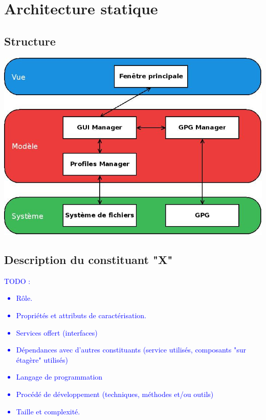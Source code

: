 \documentclass{../res/univ-projet}
\begin{document}
\section{Architecture statique}
  \subsection{Structure} %
    \includegraphics[scale=0.5]{diagramme_archi.jpg}

  \subsection{Description du constituant "X"} %
    \textcolor{blue}{
      TODO : \\
      {\begin{itemize}
        \item Rôle.
        \item Propriétés et attributs de caractérisation.
        \item Services offert (interfaces)
        \item Dépendances avec d'autres constituants (service utilisés,
        composants "sur étagère" utilisés)
        \item Langage de programmation
        \item Procédé de développement (techniques, méthodes et/ou outils)
        \item Taille et complexité.
      \end{itemize}}
    }
\end{document}
